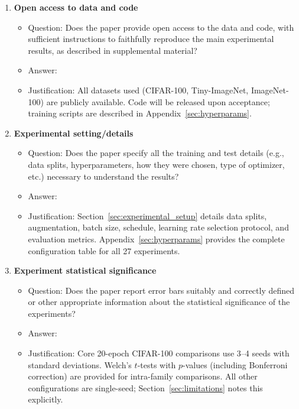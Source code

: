 \documentclass{article}
\begin{document}
\begin{enumerate}
\item {\bf Open access to data and code}
    \begin{itemize}
        \item[] Question: Does the paper provide open access to the data and code, with sufficient instructions to faithfully reproduce the main experimental results, as described in supplemental material?
        \item[] Answer: \answerYes{}
        \item[] Justification: All datasets used (CIFAR-100, Tiny-ImageNet, ImageNet-100) are publicly available. Code will be released upon acceptance; training scripts are described in Appendix~\ref{sec:hyperparams}.
    \end{itemize}

\item {\bf Experimental setting/details}
    \begin{itemize}
        \item[] Question: Does the paper specify all the training and test details (e.g., data splits, hyperparameters, how they were chosen, type of optimizer, etc.) necessary to understand the results?
        \item[] Answer: \answerYes{}
        \item[] Justification: Section~\ref{sec:experimental_setup} details data splits, augmentation, batch size, schedule, learning rate selection protocol, and evaluation metrics. Appendix~\ref{sec:hyperparams} provides the complete configuration table for all 27 experiments.
    \end{itemize}

\item {\bf Experiment statistical significance}
    \begin{itemize}
        \item[] Question: Does the paper report error bars suitably and correctly defined or other appropriate information about the statistical significance of the experiments?
        \item[] Answer: \answerYes{}
        \item[] Justification: Core 20-epoch CIFAR-100 comparisons use 3--4 seeds with standard deviations. Welch's $t$-tests with $p$-values (including Bonferroni correction) are provided for intra-family comparisons. All other configurations are single-seed; Section~\ref{sec:limitations} notes this explicitly.
    \end{itemize}


\end{enumerate}
\end{document}
